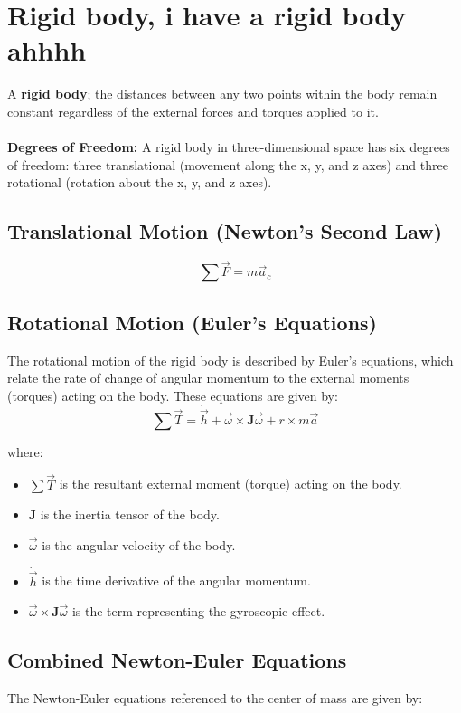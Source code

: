 \section{Rigid body, i have a rigid body ahhhh}
A \textbf{rigid body}; the distances between any two points within the body remain constant regardless of the external forces and torques applied to it.
\\
\\
\textbf{Degrees of Freedom:} A rigid body in three-dimensional space has six degrees of freedom: three translational (movement along the x, y, and z axes) and three rotational (rotation about the x, y, and z axes).

\subsection{Translational Motion (Newton's Second Law)}
\begin{equation}
    \sum \vec{F} = m \vec{a}_c
\end{equation}

\subsection{Rotational Motion (Euler's Equations)}

The rotational motion of the rigid body is described by Euler's equations, which relate the rate of change of angular momentum to the external moments (torques) acting on the body. These equations are given by:
\begin{equation}
    \sum \vec{T} = \dot{\vec{h}} + \vec{\omega} \times \mathbf{J}\vec{\omega} + r \times m\vec{a}
\end{equation}

where:
\begin{itemize}
    \item $\sum \vec{T}$ is the resultant external moment (torque) acting on the body.
    \item \( \mathbf{J} \) is the inertia tensor of the body.
    \item \( \vec{\omega} \) is the angular velocity of the body.
    \item $\dot{\vec{h}}$ is the time derivative of the angular momentum.
    \item \( \vec{\omega} \times \mathbf{J}\vec{\omega} \) is the term representing the gyroscopic effect.
\end{itemize}

\subsection{Combined Newton-Euler Equations}
The Newton-Euler equations referenced to the center of mass are given by:

